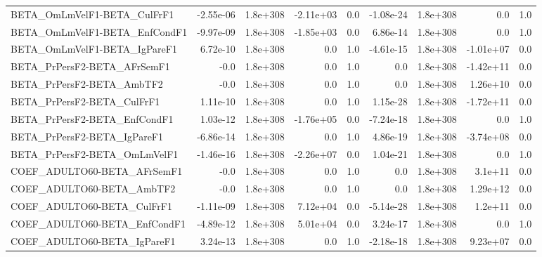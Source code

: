 \begin{tabular}{lrrrrrrrr}
BETA\_OmLmVelF1-BETA\_CulFrF1           &   -2.55e-06 &     1.8e+308 &  -2.11e+03 &      0.0 &  -1.08e-24 &    1.8e+308 &          0.0 &           1.0 \\
BETA\_OmLmVelF1-BETA\_EnfCondF1         &   -9.97e-09 &     1.8e+308 &  -1.85e+03 &      0.0 &   6.86e-14 &    1.8e+308 &          0.0 &           1.0 \\
BETA\_OmLmVelF1-BETA\_IgPareF1          &    6.72e-10 &     1.8e+308 &        0.0 &      1.0 &  -4.61e-15 &    1.8e+308 &    -1.01e+07 &           0.0 \\
BETA\_PrPersF2-BETA\_AFrSemF1           &        -0.0 &     1.8e+308 &        0.0 &      1.0 &        0.0 &    1.8e+308 &    -1.42e+11 &           0.0 \\
BETA\_PrPersF2-BETA\_AmbTF2             &        -0.0 &     1.8e+308 &        0.0 &      1.0 &        0.0 &    1.8e+308 &     1.26e+10 &           0.0 \\
BETA\_PrPersF2-BETA\_CulFrF1            &    1.11e-10 &     1.8e+308 &        0.0 &      1.0 &   1.15e-28 &    1.8e+308 &    -1.72e+11 &           0.0 \\
BETA\_PrPersF2-BETA\_EnfCondF1          &    1.03e-12 &     1.8e+308 &  -1.76e+05 &      0.0 &  -7.24e-18 &    1.8e+308 &          0.0 &           1.0 \\
BETA\_PrPersF2-BETA\_IgPareF1           &   -6.86e-14 &     1.8e+308 &        0.0 &      1.0 &   4.86e-19 &    1.8e+308 &    -3.74e+08 &           0.0 \\
BETA\_PrPersF2-BETA\_OmLmVelF1          &   -1.46e-16 &     1.8e+308 &  -2.26e+07 &      0.0 &   1.04e-21 &    1.8e+308 &          0.0 &           1.0 \\
COEF\_ADULTO60-BETA\_AFrSemF1           &        -0.0 &     1.8e+308 &        0.0 &      1.0 &        0.0 &    1.8e+308 &      3.1e+11 &           0.0 \\
COEF\_ADULTO60-BETA\_AmbTF2             &        -0.0 &     1.8e+308 &        0.0 &      1.0 &        0.0 &    1.8e+308 &     1.29e+12 &           0.0 \\
COEF\_ADULTO60-BETA\_CulFrF1            &   -1.11e-09 &     1.8e+308 &   7.12e+04 &      0.0 &  -5.14e-28 &    1.8e+308 &      1.2e+11 &           0.0 \\
COEF\_ADULTO60-BETA\_EnfCondF1          &   -4.89e-12 &     1.8e+308 &   5.01e+04 &      0.0 &   3.24e-17 &    1.8e+308 &          0.0 &           1.0 \\
COEF\_ADULTO60-BETA\_IgPareF1           &    3.24e-13 &     1.8e+308 &        0.0 &      1.0 &  -2.18e-18 &    1.8e+308 &     9.23e+07 &           0.0 \\

\end{tabular}
